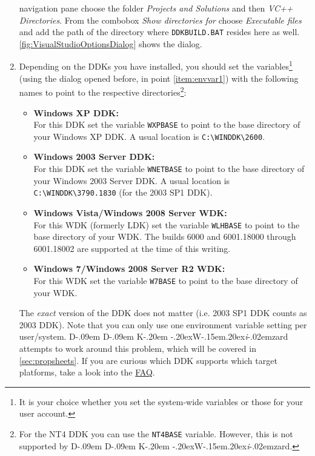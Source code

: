 \documentclass[a4paper,titlepage]{report}
\def\ddkwiz{D\kern-.09em D\kern-.09em K\kern-.20em \raise-.20ex\hbox{W}\kern-.15em\raise.20ex\hbox{\it{i}}\kern-.02em{zard}}
\begin{document}
\begin{enumerate}
    navigation pane choose the folder \emph{Projects and Solutions} and then \emph{VC++ Directories}.
    From the combobox \emph{Show directories for} choose \emph{Executable files} and add the
    path of the directory where \texttt{DDKBUILD.BAT} resides here as well.
    \autoref{fig:VisualStudioOptionsDialog} shows the dialog.
  \item \label{item:envvar2}
    Depending on the DDKs you have installed, you should set the variables\footnote{It is your
    choice whether you set the system-wide variables or those for your user account.} (using
    the dialog opened before, in point \ref{item:envvar1}) with the following names to point to the
    respective directories\footnote{For the NT4 DDK you can use the \texttt{NT4BASE} variable.
    However, this is not supported by \ddkwiz{}.}:
    \begin{itemize}
        \item
          \textbf{Windows XP DDK:}\\
            For this DDK set the variable \texttt{WXPBASE} to point to the base directory of your
            Windows XP DDK. A usual location is \verb+C:\WINDDK\2600+.
        \item
          \textbf{Windows 2003 Server DDK:}\\
            For this DDK set the variable \texttt{WNETBASE} to point to the base directory of your
            Windows 2003 Server DDK. A usual location is \verb+C:\WINDDK\3790.1830+
            (for the 2003 SP1 DDK).
        \item
          \textbf{Windows Vista/Windows 2008 Server WDK:}\\
            For this WDK (formerly LDK) set the variable \texttt{WLHBASE} to point to the base
            directory of your WDK. The builds 6000 and 6001.18000 through 6001.18002 are supported
            at the time of this writing.
        \item
          \textbf{Windows 7/Windows 2008 Server R2 WDK:}\\
            For this WDK set the variable \texttt{W7BASE} to point to the base directory of your
            WDK.
    \end{itemize}
    The \emph{exact} version of the DDK does not matter (i.e. 2003 SP1 DDK counts as 2003 DDK).
    Note that you can only use one environment variable setting per user/system. \ddkwiz{}
    attempts to work around this problem, which will be covered in \autoref{sec:propsheets}.
    If you are curious which DDK supports which target platforms, take a look into the
    \hyperref[cha:faq]{FAQ}.
\end{enumerate}
\end{document}
